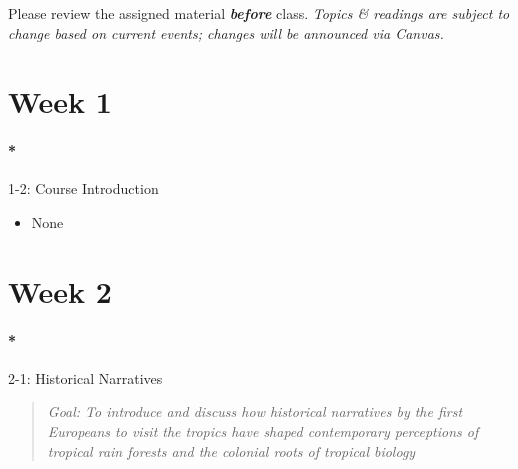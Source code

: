 \documentclass[
  10pt,
  letterpaper,
  oneside,
  open=any]{scrbook}
\let\oldparagraph\paragraph
\renewcommand{\paragraph}[1]{\oldparagraph{#1}\mbox{}}
\providecommand{\tightlist}{%
  \setlength{\itemsep}{0pt}\setlength{\parskip}{0pt}}\usepackage{longtable,booktabs,array}
\begin{document}
\begin{tcolorbox}[enhanced jigsaw, arc=.35mm, coltitle=black, left=2mm, colback=white, breakable, rightrule=.15mm, bottomrule=.15mm, opacitybacktitle=0.6, opacityback=0, colbacktitle=quarto-callout-important-color!10!white, bottomtitle=1mm, toptitle=1mm, colframe=quarto-callout-important-color-frame, titlerule=0mm, toprule=.15mm, title=\textcolor{quarto-callout-important-color}{\faExclamation}\hspace{0.5em}{Important}, leftrule=.75mm]

Please review the assigned material \textbf{\emph{before}} class.
\emph{Topics \& readings are subject to change based on current events;
changes will be announced via Canvas.}

\end{tcolorbox}

\section*{Week 1}\label{week-1}


\paragraph*{1-2: Course Introduction}\label{course-introduction}

\begin{itemize}
\tightlist
\item
  None
\end{itemize}

\section*{Week 2}\label{week-2}


\paragraph*{2-1: Historical Narratives}\label{historical-narratives}

\begin{quote}
\emph{Goal: To introduce and discuss how historical narratives by the
first Europeans to visit the tropics have shaped contemporary
perceptions of tropical rain forests and the colonial roots of tropical
biology}
\end{quote}
\end{document}

